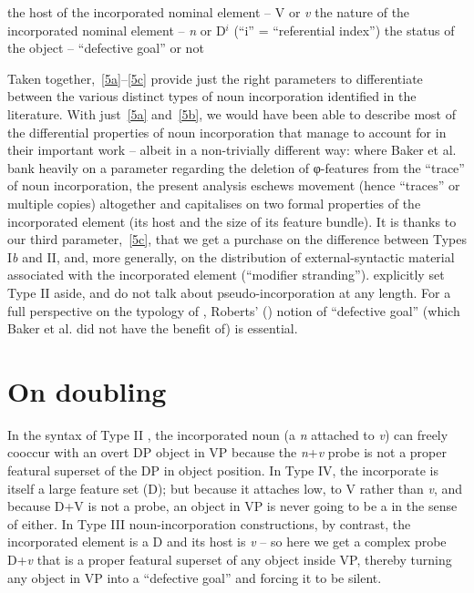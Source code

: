 \documentclass[output=paper]{langsci/langscibook}
\begin{document}
\begin{refcontext}
\begin{exe}
    \begin{xlist}
    \ex  the host of the incorporated nominal element -- V or \emph{v}
    \ex  the nature of the incorporated nominal element -- \emph{n} or D$^i$ (\enquote{i} = \enquote{referential index})
    \ex  the status of the object -- \enquote{defective goal} or not
    \end{xlist}
\end{exe}
Taken together,~\eqref{5a}--\eqref{5c} provide just the right parameters to
differentiate between the various distinct types of noun incorporation
identified in the literature. With just~\eqref{5a} and~\eqref{5b}, we would have
been able to describe most of the differential properties of noun incorporation
that \cite{bakeretal05}  manage to account for in their important work --
albeit in a non-trivially different way: where Baker et al. bank heavily on a
parameter regarding the deletion of φ{}-features from the \enquote{trace} of noun
incorporation, the present analysis eschews movement (hence \enquote{traces} or
multiple copies) altogether and capitalises on two formal properties of the
incorporated element (its host and the size of its feature bundle). It is
thanks to our third parameter,~\eqref{5c}, that we get a purchase on the
difference between Types I\emph{b} and II, and, more generally, on the
distribution of external-syntactic material associated with the incorporated
element (\enquote{modifier stranding}). \cite{bakeretal05} explicitly set Type II
aside, and do not talk about pseudo-incorporation at any length. For a full
perspective on the typology of , Roberts’
(\citeyear{Roberts2010}) notion of \enquote{defective goal} (which Baker et al. did
not have the benefit of) is essential.




\section{On doubling}
\label{sec:16.3}

In the syntax of Type II , the incorporated noun (a \emph{n}
attached to \emph{v}) can freely cooccur with an overt DP object in VP because
the \emph{n}+\emph{v} probe is not a proper featural superset of the DP in
object position. In Type IV, the incorporate is itself a large feature set (D);
but because it attaches low, to V rather than \emph{v}, and because D+V is not
a probe, an object in VP is never going to be a  in the sense of
\cite{Roberts2010} either. In Type III noun-incorporation constructions, by
contrast, the incorporated element is a D and its host is \emph{v} -- so here
we get a complex probe D+\emph{v} that is a proper featural superset of any
object inside VP, thereby turning any object in VP into a \enquote{defective
goal} and forcing it to be silent.


\end{refcontext}
\end{document}
